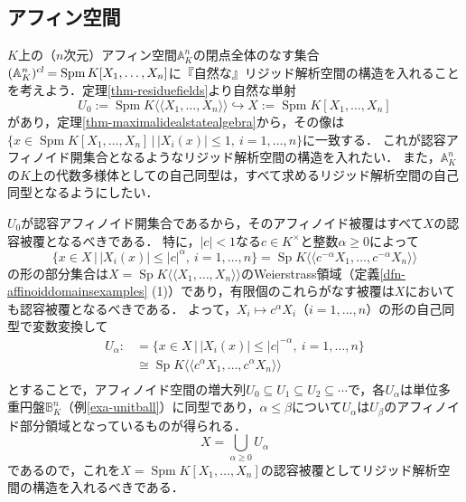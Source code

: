 \documentclass[a4paper,12pt, dvipdfmx]{jsbook}
\def\A{\mathbb{A}}
\def\B{\mathbb{B}}
\def\cl{\mathop{\textsl{cl}}\nolimits}
\def\Spm{\mathop{\mathrm{Spm}}\nolimits}
\def\Sp{\mathop{\mathrm{Sp}}\nolimits}
\def\dl{\langle\!\langle}
\def\dr{\rangle\!\rangle}
\newcommand{\abs}[1]{\lvert#1\rvert}
\theoremstyle{plain}
\theoremstyle{definition}
\begin{document}
\subsection{アフィン空間}\label{sub-exarigidspacesaffine}
$K$上の（$n$次元）アフィン空間$\A^n_K$の閉点全体のなす集合$(\A^n_K)^{\cl}=\Spm K[X_1,\ldots,X_n]$に『自然な』リジッド解析空間の構造を入れることを考えよう．定理\ref{thm-residuefields}より自然な単射
$$
U_0:=\Spm K\dl X_1,\ldots,X_n\dr\hookrightarrow X:=\Spm K[X_1,\ldots,X_n]
$$
があり，定理\ref{thm-maximalidealstatealgebra}から，その像は$\{x\in \Spm K[X_1,\ldots,X_n]\,|\,\abs{X_i(x)}\leq 1,\ i=1,\ldots,n\}$に一致する．
これが認容アフィノイド開集合となるようなリジッド解析空間の構造を入れたい．
また，$\A^n_K$の$K$上の代数多様体としての自己同型は，すべて求めるリジッド解析空間の自己同型となるようにしたい．

$U_0$が認容アフィノイド開集合であるから，そのアフィノイド被覆はすべて$X$の認容被覆となるべきである．
特に，$\abs{c}<1$なる$c\in K^{\times}$と整数$\alpha\geq 0$によって
$$
\{x\in X\,|\,\abs{X_i(x)}\leq\abs{c}^{\alpha},\ i=1,\ldots,n\}=\Sp K\dl c^{-\alpha}X_1,\ldots,c^{-\alpha}X_n\dr
$$
の形の部分集合は$X=\Sp K\dl X_1,\ldots,X_n\dr$のWeierstrass領域（定義\ref{dfn-affinoiddomainsexamples} (1)）であり，有限個のこれらがなす被覆は$X$においても認容被覆となるべきである．
よって，$X_i\mapsto c^{\alpha}X_i$（$i=1,\ldots,n$）の形の自己同型で変数変換して
\begin{equation*}
\begin{split}
U_{\alpha}:&=\{x\in X\,|\,\abs{X_i(x)}\leq\abs{c}^{-\alpha},\ i=1,\ldots,n\}\\ &\cong\Sp K\dl c^{\alpha}X_1,\ldots,c^{\alpha}X_n\dr\\ 
\end{split}
\end{equation*}
とすることで，アフィノイド空間の増大列$U_0\subseteq U_1\subseteq U_2\subseteq\cdots$で，各$U_{\alpha}$は単位多重円盤$\B^n_K$（例\ref{exa-unitball}）に同型であり，$\alpha\leq\beta$について$U_{\alpha}$は$U_{\beta}$のアフィノイド部分領域となっているものが得られる．
$$
X=\bigcup_{\alpha\geq 0}U_{\alpha}
$$
であるので，これを$X=\Spm K[X_1,\ldots,X_n]$の認容被覆としてリジッド解析空間の構造を入れるべきである．
\end{document}
